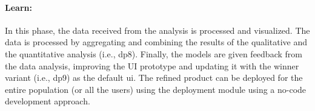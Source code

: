 \paragraph{Learn:}
\label{design:paragraph:learn}
In this phase, the data received from the analysis is processed and visualized. 
The data is processed by aggregating and combining the results of the qualitative and the quantitative analysis (i.e., \ac{dp}8). 
Finally, the models are given feedback from the data analysis, improving the UI prototype and updating it with the winner variant (i.e., \ac{dp}9) as the default \ac{ui}.
The refined product can be deployed for the entire population (or all the users) using the deployment module using a no-code development approach.
